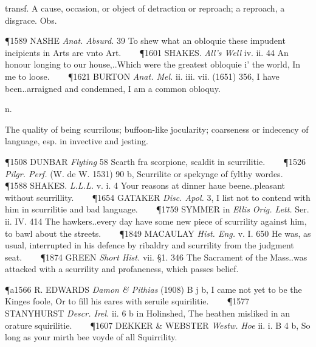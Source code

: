 \begin{description}[wide, labelwidth=!, labelindent=0pt]
\begin{myenumerate}
 transf. A cause, occasion, or object of detraction or reproach; a reproach, a disgrace. Obs.

\P 1589 NASHE  \textit{Anat. Absurd.} 39 To shew what an obloquie these impudent incipients in Arts are vnto Art.    
\P 1601 SHAKES.  \textit{All's Well} iv. ii. 44 An honour longing to our house,..Which were the greatest obloquie i' the world, In me to loose.    
\P 1621 BURTON  \textit{Anat. Mel.} ii. iii. vii. (1651) 356, I have been..arraigned and condemned, I am a common obloquy.
\end{myenumerate}


 n.

\noindent {}

\vspace{-0.3cm}

\begin{myenumerate}

 The quality of being scurrilous; buffoon-like jocularity; coarseness or indecency of language, esp. in invective and jesting.

\P 1508 DUNBAR  \textit{Flyting} 58 Scarth fra scorpione, scaldit in scurrilitie.    
\P 1526  \textit{Pilgr. Perf.} (W. de W. 1531) 90 b, Scurrilite or spekynge of fylthy wordes.    
\P 1588 SHAKES.  \textit{L.L.L.} v. i. 4 Your reasons at dinner haue beene..pleasant without scurrillity.    
\P 1654 GATAKER  \textit{Disc. Apol.} 3, I list not to contend with him in scurrilitie and bad language.    
\P 1759 SYMMER in  \textit{Ellis Orig. Lett.} Ser. ii. IV. 414 The hawkers..every day have some new piece of scurrility against him, to bawl about the streets.    
\P 1849 MACAULAY  \textit{Hist. Eng.} v. I. 650 He was, as usual, interrupted in his defence by ribaldry and scurrility from the judgment seat.    
\P 1874 GREEN  \textit{Short Hist.} vii. §1. 346 The Sacrament of the Mass..was attacked with a scurrility and profaneness, which passes belief.

\P a1566 R. EDWARDS  \textit{Damon \& Pithias} (1908) B j b, I came not yet to be the Kinges foole, Or to fill his eares with seruile squirilitie.    
\P 1577 STANYHURST  \textit{Descr. Irel.} ii. 6 b in Holinshed, The heathen misliked in an orature squirilitie.    
\P 1607 DEKKER \& WEBSTER  \textit{Westw. Hoe} ii. i. B 4 b, So long as your mirth bee voyde of all Squirrility.


\end{myenumerate}
\end{description}
